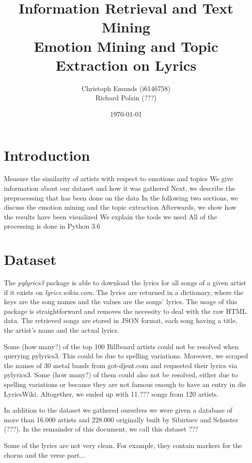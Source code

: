 \documentclass[10pt,a4paper]{article}
\author{Christoph Emunds (i6146758)\\Richard Polzin (???)}
\title{Information Retrieval and Text Mining\\Emotion Mining and Topic Extraction on Lyrics}
\date{\today}
\begin{document}
	\maketitle
	
	\tableofcontents
	
	\section{Introduction}
	\label{sec:introduction}
	Measure the similarity of artists with respect to emotions and topics
	We give information about our dataset and how it was gathered
	Next, we describe the preprocessing that has been done on the data
	In the following two sections, we discuss the emotion mining and the topic extraction
	Afterwards, we show how the results have been visualized
	We explain the tools we used
	All of the processing is done in Python 3.6

	\section{Dataset}
	The \textit{pylyrics3} package is able to download the lyrics for all songs of a given artist if it exists on \textit{lyrics.wikia.com}. The lyrics are returned in a dictionary, where the keys are the song names and the values are the songs' lyrics. The usage of this package is straightforward and removes the necessity to deal with the raw HTML data. The retrieved songs are stored in JSON format, each song having a title, the artist's name and the actual lyrics.
	
	Some (how many?) of the top 100 Billboard artists could not be resolved when querying pylyrics3. This could be due to spelling variations. Moreover, we scraped the names of 30 metal bands from got-djent.com and requested their lyrics via pylyrics3. Some (how many?) of them could also not be resolved, either due to spelling variations or because they are not famous enough to have an entry in die LyricsWiki. Altogether, we ended up with 11.??? songs from 120 artists.

	In addition to the dataset we gathered ourselves we were given a database of more than 16.000 artists and 228.000 originally built by Sibirtsev and Schuster (???). In the remainder of this document, we call this dataset ???
	
	Some of the lyrics are not very clean. For example, they contain markers for the chorus and the verse part...
\end{document}
